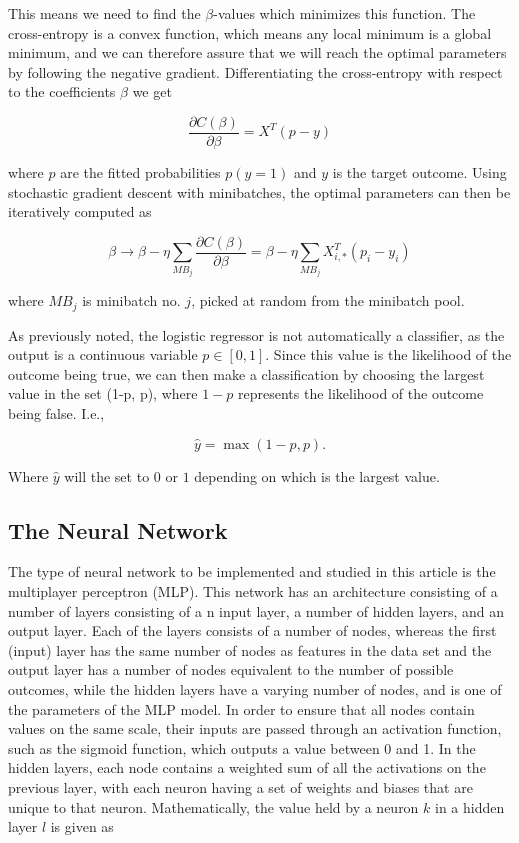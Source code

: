 \documentclass[a4paper,10pt,english]{article}
\begin{document}
This means we need to find the $\beta$-values which minimizes this function. The cross-entropy is a convex function, which means any local minimum is a global minimum, and we can therefore assure that we will reach the optimal parameters by following the negative gradient. Differentiating the cross-entropy with respect to the coefficients $\beta$ we get

$$\frac{\partial C(\beta)}{\partial \beta} = X^T (p - y)$$

where $p$ are the fitted probabilities $p(y=1)$ and $y$ is the target outcome. Using stochastic gradient descent with minibatches, the optimal parameters can then be iteratively computed as

$$\beta \rightarrow \beta - \eta \sum_{MB_j} \frac{\partial C(\beta)}{\partial \beta} = \beta - \eta \sum_{MB_j} X_{i,*}^T (p_i - y_i) $$

where $MB_j$ is minibatch no. $j$, picked at random from the minibatch pool. 

As previously noted, the logistic regressor is not automatically a classifier, as the output is a continuous variable $p \in [0, 1]$. Since this value is the likelihood of the outcome being true, we can then make a classification by choosing the largest value in the set (1-p, p), where $1-p$ represents the likelihood of the outcome being false. I.e.,

$$\hat{y} = \max{\left( 1-p, p \right)}.$$

Where $\hat{y}$ will the set to $0$ or $1$ depending on which is the largest value. 

\subsection{The Neural Network}

The type of neural network to be implemented and studied in this article is the multiplayer perceptron (MLP). This network has an architecture consisting of a number of layers consisting of a n input layer, a number of hidden layers, and an output layer. Each of the layers consists of a number of nodes, whereas the first (input) layer has the same number of nodes as features in the data set and the output layer has a number of nodes equivalent to the number of possible outcomes, while the hidden layers have a varying number of nodes, and is one of the parameters of the MLP model. In order to ensure that all nodes contain values on the same scale, their inputs are passed through an activation function, such as the sigmoid function, which outputs a value between 0 and 1. In the hidden layers, each node contains a weighted sum of all the activations on the previous layer, with each neuron having a set of weights and biases that are unique to that neuron. Mathematically, the value held by a neuron $k$ in a hidden layer $l$ is given as
\end{document}
